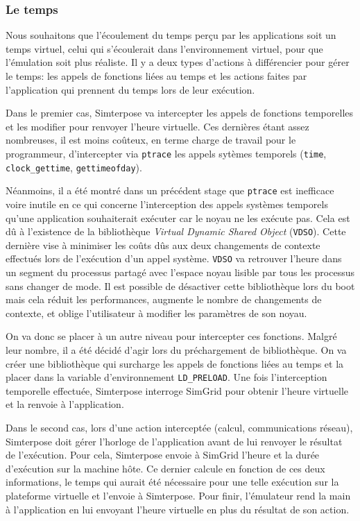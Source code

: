 \subsubsection{Le temps}
\label{subsubsection:time}

Nous souhaitons que l'écoulement du temps perçu par les applications soit un
temps virtuel, celui qui s'écoulerait dans l'environnement virtuel, pour que
l'émulation soit plus réaliste. Il y a deux types d'actions à différencier pour
gérer le temps: les appels de fonctions liées au temps et les actions faites par
l'application qui prennent du temps lors de leur exécution.

Dans le premier cas, Simterpose va intercepter les appels de fonctions
temporelles et les modifier pour renvoyer l'heure virtuelle. Ces dernières étant
assez nombreuses, il est moins coûteux, en terme charge de travail pour
le programmeur, d'intercepter via
\texttt{ptrace} les appels sytèmes temporels (\texttt{time},
\texttt{clock\_gettime}, \texttt{gettimeofday}).

Néanmoins, il a été montré dans un précédent stage
\citep{CHLOE:Emulationapplicationdistribuees} que \texttt{ptrace} est inefficace
voire inutile en ce qui concerne l'interception des appels systèmes temporels
qu'une application souhaiterait exécuter car le noyau ne les exécute pas. Cela
est dû à l'existence de la bibliothèque \textit{Virtual Dynamic Shared Object}
(\texttt{VDSO}). Cette dernière vise à minimiser les coûts dûs aux deux changements de contexte effectués lors de l'exécution d'un appel système. \texttt{VDSO} va retrouver l'heure dans un segment du processus partagé avec l'espace noyau lisible par tous les processus sans changer de mode. Il est possible de désactiver cette bibliothèque lors du boot mais cela réduit les performances, augmente le nombre de changements de contexte, et oblige l'utilisateur à modifier les paramètres de son noyau.

On va donc se placer à un autre niveau pour intercepter ces
fonctions. Malgré leur nombre, il a été décidé d'agir lors du
préchargement de bibliothèque. On va créer une bibliothèque qui
surcharge les appels de fonctions liées au temps et la placer dans la
variable d'environnement \texttt{LD\_PRELOAD}. Une fois l'interception
temporelle effectuée, Simterpose interroge SimGrid pour obtenir
l'heure virtuelle et la renvoie à l'application.

Dans le second cas, lors d'une action interceptée (calcul, communications
réseau), Simterpose doit gérer l'horloge de l'application avant de lui renvoyer
le résultat de l'exécution. Pour cela, Simterpose envoie à SimGrid l'heure et la
durée d'exécution sur la machine hôte. Ce dernier calcule en fonction de ces
deux informations, le temps qui aurait été nécessaire pour une telle exécution
sur la plateforme virtuelle et l'envoie à Simterpose. Pour finir, l'émulateur
rend la main à l'application en lui envoyant l'heure virtuelle en plus du
résultat de son action.
